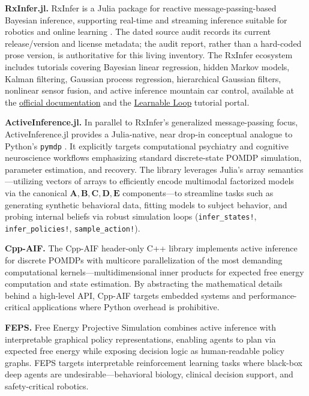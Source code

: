 \documentclass[
  english,
]{article}
\begin{document}
\textbf{RxInfer.jl.} RxInfer is a Julia package for reactive
message-passing-based Bayesian inference, supporting real-time and
streaming inference suitable for robotics and online learning
\citep{rxinfer2025}. The dated source audit records its current
release/version and license metadata; the audit report, rather than a
hard-coded prose version, is authoritative for this living inventory.
The RxInfer ecosystem includes tutorials covering Bayesian linear
regression, hidden Markov models, Kalman filtering, Gaussian process
regression, hierarchical Gaussian filters, nonlinear sensor fusion, and
active inference mountain car control, available at the
\href{https://reactivebayes.github.io/RxInfer.jl/stable/}{official
documentation} and the \href{https://learnableloop.com/}{Learnable Loop}
tutorial portal.

\textbf{ActiveInference.jl.} In parallel to RxInfer's generalized
message-passing focus, ActiveInference.jl provides a Julia-native, near
drop-in conceptual analogue to Python's \texttt{pymdp}
\citep{ActiveInferencejl}. It explicitly targets computational
psychiatry and cognitive neuroscience workflows emphasizing standard
discrete-state POMDP simulation, parameter estimation, and recovery. The
library leverages Julia's array semantics---utilizing vectors of arrays
to efficiently encode multimodal factorized models via the canonical
\(\mathbf{A}, \mathbf{B}, \mathbf{C}, \mathbf{D}, \mathbf{E}\)
components---to streamline tasks such as generating synthetic behavioral
data, fitting models to subject behavior, and probing internal beliefs
via robust simulation loops (\texttt{infer\_states!},
\texttt{infer\_policies!}, \texttt{sample\_action!}).

\textbf{Cpp-AIF.} The Cpp-AIF header-only C++ library
\citep{gregoretti2023cppaif} implements active inference for discrete
POMDPs with multicore parallelization of the most demanding
computational kernels---multidimensional inner products for expected
free energy computation and state estimation. By abstracting the
mathematical details behind a high-level API, Cpp-AIF targets embedded
systems and performance-critical applications where Python overhead is
prohibitive.

\textbf{FEPS.} Free Energy Projective Simulation \citep{pazem2024feps}
combines active inference with interpretable graphical policy
representations, enabling agents to plan via expected free energy while
exposing decision logic as human-readable policy graphs. FEPS targets
interpretable reinforcement learning tasks where black-box deep agents
are undesirable---behavioral biology, clinical decision support, and
safety-critical robotics.
\end{document}
